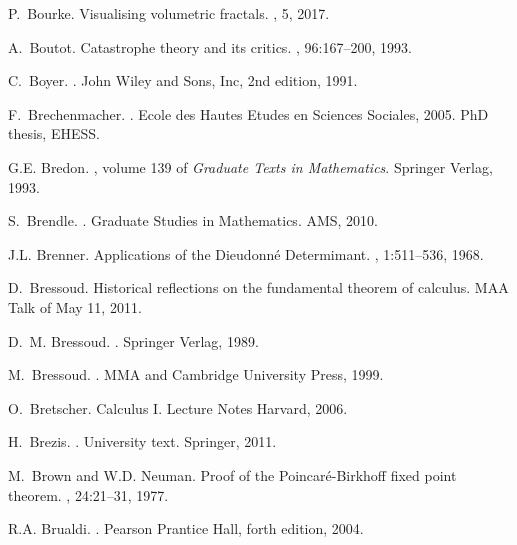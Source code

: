 \documentclass[12pt]{amsart}
\begin{document}
\begin{thebibliography}{100}
P.~Bourke.
\newblock Visualising volumetric fractals.
, 5, 2017.

A.~Boutot.
\newblock Catastrophe theory and its critics.
, 96:167--200, 1993.

C.~Boyer.
.
\newblock John Wiley and Sons, Inc, 2nd edition, 1991.

F.~Brechenmacher.
.
\newblock Ecole des Hautes Etudes en Sciences Sociales, 2005.
\newblock PhD thesis, EHESS.

G.E. Bredon.
, volume 139 of {\em Graduate Texts in
  Mathematics}.
\newblock Springer Verlag, 1993.

S.~Brendle.
.
\newblock Graduate Studies in Mathematics. AMS, 2010.

J.L. Brenner.
\newblock Applications of the {D}ieudonn\'e {D}etermimant.
, 1:511--536, 1968.

D.~Bressoud.
\newblock Historical reflections on the fundamental theorem of calculus.
\newblock MAA Talk of May 11, 2011.

D.~M. Bressoud.
.
\newblock Springer Verlag, 1989.

M.~Bressoud.
.
\newblock MMA and Cambridge University Press, 1999.

O.~Bretscher.
\newblock Calculus {I}.
\newblock Lecture Notes Harvard, 2006.

H.~Brezis.
.
\newblock University text. Springer, 2011.

M.~Brown and W.D. Neuman.
\newblock Proof of the {Poincar\'e-Birkhoff} fixed point theorem.
, 24:21--31, 1977.

R.A. Brualdi.
.
\newblock Pearson Prantice Hall, forth edition, 2004.


\end{thebibliography}
\end{document}
